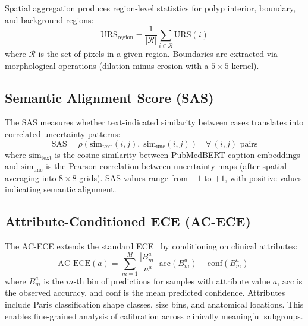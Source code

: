 Spatial aggregation produces region-level statistics for polyp interior, boundary, and background regions:
\begin{equation}
	\text{URS}_{\text{region}} = \frac{1}{|\mathcal{R}|} \sum_{i \in \mathcal{R}} \text{URS}(i)
\end{equation}
where $\mathcal{R}$ is the set of pixels in a given region. Boundaries are extracted via morphological operations (dilation minus erosion with a $5 \times 5$ kernel).

\subsection{Semantic Alignment Score (SAS)}
\label{sec:approach:sas}

The \ac{SAS} measures whether text-indicated similarity between cases translates into correlated uncertainty patterns:
\begin{equation}
	\text{SAS} = \rho\left(\text{sim}_{\text{text}}(i, j),\; \text{sim}_{\text{unc}}(i, j)\right) \quad \forall\, (i, j) \text{ pairs}
\end{equation}
where $\text{sim}_{\text{text}}$ is the cosine similarity between PubMedBERT caption embeddings and $\text{sim}_{\text{unc}}$ is the Pearson correlation between uncertainty maps (after spatial averaging into $8 \times 8$ grids). SAS values range from $-1$ to $+1$, with positive values indicating semantic alignment.

\subsection{Attribute-Conditioned ECE (AC-ECE)}
\label{sec:approach:acece}

The \ac{AC-ECE} extends the standard \ac{ECE}~\cite{naeini2015obtaining} by conditioning on clinical attributes:
\begin{equation}
	\text{AC-ECE}(a) = \sum_{m=1}^{M} \frac{|B_m^a|}{n^a} \left| \text{acc}(B_m^a) - \text{conf}(B_m^a) \right|
\end{equation}
where $B_m^a$ is the $m$-th bin of predictions for samples with attribute value $a$, $\text{acc}$ is the observed accuracy, and $\text{conf}$ is the mean predicted confidence. Attributes include Paris classification shape classes, size bins, and anatomical locations. This enables fine-grained analysis of calibration across clinically meaningful subgroups.
